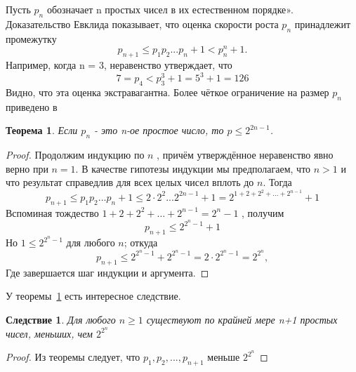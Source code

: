 \documentclass[11pt]{article}
\newtheorem{theorem}{Теорема}
\newtheorem{corollary}{Следствие}
\begin{document}
Пусть $p_{n}$ обозначает n простых чисел в их естественном порядке». Доказательство Евклида показывает, что оценка скорости роста $p_{n}$ принадлежит промежутку \[p_{n+1} \leq p_{1}p_{2}...p_{n}+1 < p_{n}^{n}+1 .\] Например, когда n = 3, неравенство утверждает, что \[7 = p_{4} < p_{3}^{3} + 1 = 5^{3} + 1 = 126\] Видно, что эта оценка экстравагантна. Более чёткое ограничение на размер $p_{n}$ приведено в
\thispagestyle{fancy}
\lhead{\thepage}
\begin{theorem}
	\label{th3-5}
	Если $p_{n}$ - это n-ое простое число, то $p \leq 2^{2n-1}$.
\end{theorem}
\begin{proof}
Продолжим индукцию по $n$ , причём утверждённое неравенство явно верно при $n = 1$. В качестве гипотезы индукции мы предполагаем, что $n > 1$ и что результат справедлив для всех целых чисел вплоть до $n$. Тогда \[p_{n+1} \leq p_{1}p_{2}...p_{n}+1 \leq 2 \cdot 2^{2} ...2^{2n-1} + 1 = 2^{1+2+2^{2}+...+2^{n-1}}+1 \]
Вспоминая тождество $1 + 2 + 2^{2}+ … + 2^{n-1} = 2^{n}  - 1$ , получим \[p_{n+1} \leq 2^{2^{n}-1}+1\]
Но $1 \leq 2^{2^{n}-1}$ для любого $n$; откуда \[p_{n+1} \leq 2^{2^n-1} + 2^{2^n-1} = 2 \cdot 2^{2^{n}-1} = 2^{2^{n}},\] Где завершается шаг индукции и аргумента.
\end{proof}
	У теоремы~\ref{th3-5} есть интересное следствие. 
	\begin{corollary}
		Для любого $n \geq 1$ существуют по крайней мере n+1 простых чисел, меньших, чем $2^{2^{n}}$
	\end{corollary}
\begin{proof}
	Из теоремы следует, что $p_1,p_2,...,p_{n+1}$ меньше $2^{2^{n}}$
\end{proof}
\end{document}
